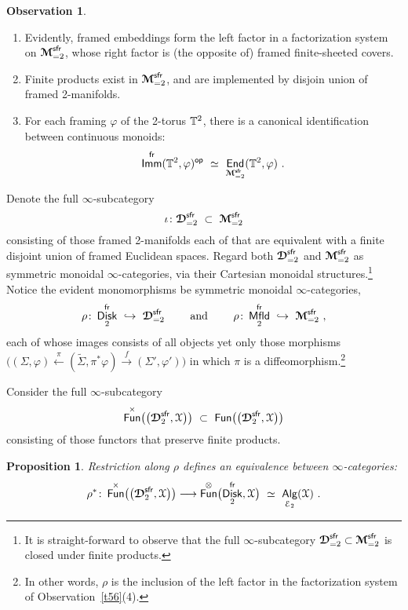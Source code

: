 \documentclass{amsart}
\newtheorem{prop}[theorem]{Proposition}
\theoremstyle{definition}
\newtheorem{observation}[theorem]{Observation}
\theoremstyle{remark}
\DeclareMathOperator{\Alg}{\sf Alg}
\DeclareMathOperator{\End}{\sf End}
\DeclareMathOperator{\Fun}{{\sf Fun}}
\DeclareMathOperator{\op}{\mathsf{op}}
\DeclareMathOperator{\Mfld}{{\sf Mfld}}
\DeclareMathOperator{\Disk}{{\sf Disk}}
\DeclareMathOperator{\fr}{\sf fr}
\DeclareMathOperator{\sfr}{\sf sfr}
\def\ot{\otimes}
\newcommand{\w}{\widetilde}
\newcommand{\xra}{\xrightarrow}
\newcommand{\xla}{\xleftarrow}
\def\cE{\mathcal E}\def\cF{\mathcal F}\def\cG{\mathcal G}\def\cH{\mathcal H}
\def\bcD{\boldsymbol{\mathcal D}}\def\bcE{\boldsymbol{\mathcal E}}\def\bcF{\boldsymbol{\mathcal F}}
\def\bcM{\boldsymbol{\mathcal M}}\def\bcN{\boldsymbol{\mathcal N}}\def\bcO{\boldsymbol{\mathcal O}}\def\bcP{\boldsymbol{\mathcal P}}\def\bcQ{\boldsymbol{\mathcal Q}}\def\bcR{\boldsymbol{\mathcal R}}
\def\bcM{\boldsymbol{\mathcal M}}
\DeclareMathOperator{\Imm}{\sf Imm}
\begin{document}
\begin{observation}
\begin{enumerate}
\item
Evidently, framed embeddings form the left factor in a factorization system on $\bcM_{=2}^{\sfr}$, whose right factor is (the opposite of) framed finite-sheeted covers.  


\item
Finite products exist in $\bcM_{=2}^{\sfr}$, and are implemented by disjoin union of framed 2-manifolds.


\item
For each framing $\varphi$ of the 2-torus $\mathbb T^2$, there is a canonical identification between continuous monoids:
\[
\Imm^{\fr}( \TT^2,\varphi)^{\op}
~\simeq~
\End_{\bcM_{=2}^{\sfr}}(\TT^2,\varphi)
~.
\]


\end{enumerate}

\end{observation}
Denote the full $\infty$-subcategory
\[
\iota
\colon
\bcD_{=2}^{\sfr}
~\subset~
\bcM_{=2}^{\sfr}
\]
consisting of those framed 2-manifolds each of that are equivalent with a finite disjoint union of framed Euclidean spaces.
Regard both $\bcD_{=2}^{\sfr}$ and $\bcM_{=2}^{\sfr}$ as symmetric monoidal $\infty$-categories, via their Cartesian monoidal structures.\footnote{It is straight-forward to observe that the full $\infty$-subcategory $\bcD_{=2}^{\sfr}\subset \bcM_{=2}^{\sfr}$ is closed under finite products.}
Notice the evident monomorphisms be symmetric monoidal $\infty$-categories,
\[
\rho
\colon 
\Disk_2^{\fr}
~\hookrightarrow~
\bcD_{=2}^{\sfr}
\qquad
\text{ and }
\qquad
\rho
\colon 
\Mfld_2^{\fr}
~\hookrightarrow~
\bcM_{=2}^{\sfr}
~,
\]
each of whose images consists of all objects yet only those morphisms $\bigl( (\Sigma,\varphi) \xla{\pi} (\w{\Sigma},\pi^\ast \varphi) \xra{f} (\Sigma',\varphi')\bigr)$ in which $\pi$ is a diffeomorphism.\footnote{In other words, $\rho$ is the inclusion of the left factor in the factorization system of Observation~\ref{t56}(4).}


Consider the full $\infty$-subcategory
\[
\Fun^{\times}\bigl(
\bigl( \bcD_{2}^{\sfr}, \cX \bigr)
\bigr)
~\subset~
\Fun\bigl(
\bigl( \bcD_{2}^{\sfr}, \cX \bigr)
\bigr)
\]
consisting of those functors that preserve finite products.  
\begin{prop}
\label{t58}
Restriction along $\rho$ defines an equivalence between $\infty$-categories:
\[
\rho^\ast
\colon
\Fun^{\times}\bigl(
\bigl( \bcD_{2}^{\sfr}, \cX \bigr)
\bigr)
\longrightarrow
\Fun^{\ot}\bigl( \Disk_2^{\fr} , \cX \bigr)
~\simeq~
\Alg_{\cE_2}(\cX)
~.
\]

\end{prop}
\end{document}
